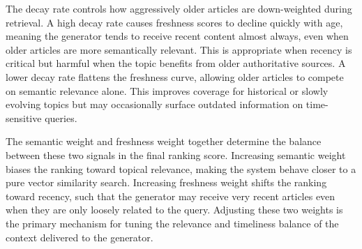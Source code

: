 The decay rate controls how aggressively older articles are down-weighted during retrieval. A high decay rate causes freshness scores to decline quickly with age, meaning the generator tends to receive recent content almost always, even when older articles are more semantically relevant. This is appropriate when recency is critical but harmful when the topic benefits from older authoritative sources. A lower decay rate flattens the freshness curve, allowing older articles to compete on semantic relevance alone. This improves coverage for historical or slowly evolving topics but may occasionally surface outdated information on time-sensitive queries.

The semantic weight and freshness weight together determine the balance between these two signals in the final ranking score. Increasing semantic weight biases the ranking toward topical relevance, making the system behave closer to a pure vector similarity search. Increasing freshness weight shifts the ranking toward recency, such that the generator may receive very recent articles even when they are only loosely related to the query. Adjusting these two weights is the primary mechanism for tuning the relevance and timeliness balance of the context delivered to the generator.